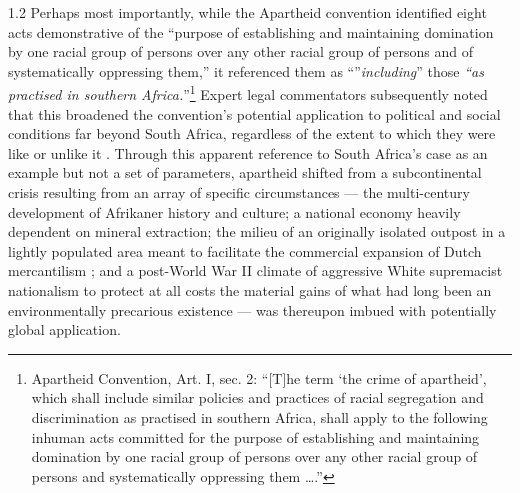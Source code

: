 \documentclass[../unravbook.tex]{subfiles}
\begin{document}
\begin{spacing}{1.2}
Perhaps most importantly, while the Apartheid convention identified eight acts demonstrative of the ``purpose of establishing and maintaining domination by one racial group of persons over any other racial group of persons and of systematically oppressing them,'' it referenced them as ``''\textit{including}'' those \textit{``as practised in southern Africa.}''\footnote{Apartheid Convention, Art. I, sec. 2: \enquote{[T]he term `the crime of apartheid', which shall include similar policies and practices of racial segregation and discrimination as practised in southern Africa, shall apply to the following inhuman acts committed for the purpose of establishing and maintaining domination by one racial group of persons over any other racial group of persons and systematically oppressing them \ldots.}} Expert legal commentators subsequently noted that this broadened the convention's potential application to political and social conditions far beyond South Africa, regardless of the extent to which they were like or unlike it \parencite[211]{Reynolds-2012}. Through this apparent reference to South Africa's case as an example but not a set of parameters,   apartheid shifted from a subcontinental crisis resulting from an array of specific circumstances --- the multi-century development of Afrikaner history and culture; a national economy heavily dependent on mineral extraction; the milieu of an originally isolated outpost in a lightly populated area meant to facilitate the commercial expansion of Dutch mercantilism \parencite [xv--xviii]{Brookes-2023}; and a post-World War II climate of aggressive White supremacist nationalism to protect at all costs the material gains of what had long been an environmentally precarious existence --- was thereupon imbued with potentially global application.


\end{spacing}
\end{document}
